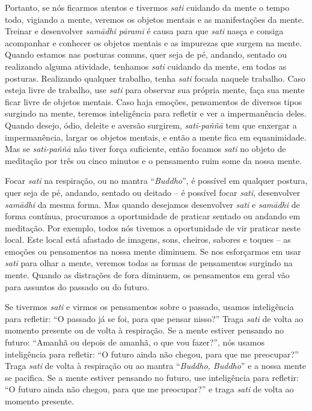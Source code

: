 Portanto, se nós ficarmos atentos e tivermos \textit{sati }cuidando
da mente o tempo todo, vigiando a mente, veremos os objetos mentais e
as manifestações da mente. Treinar e desenvolver \textit{samādhi
pāramī }é causa para que \textit{sati }nasça e consiga acompanhar
e conhecer os objetos mentais e as impurezas que surgem na mente.
Quando estamos nas posturas comuns, quer seja de pé, andando, sentado
ou realizando alguma atividade, tenhamos \textit{sati }cuidando da
mente, em todas as posturas. Realizando qualquer trabalho, tenha
\textit{sati }focada naquele trabalho. Caso esteja livre de trabalho,
use \textit{sati }para observar sua própria mente, faça sua mente ficar
livre de objetos mentais. Caso haja emoções, pensamentos de diversos
tipos surgindo na mente, teremos inteligência para refletir e ver a
impermanência deles. Quando desejo, ódio, deleite e aversão surgirem,
\textit{sati-paññā }tem que enxergar a impermanência, largar os
objetos mentais, e então a mente fica em equanimidade. Mas se
\textit{sati-paññā }não tiver força suficiente, então focamos
\textit{sati }no objeto de meditação por três ou cinco minutos e o
pensamento ruim some da nossa mente.

Focar \textit{sati }na respiração, ou no mantra “\textit{Buddho}”, é
possível em qualquer postura, quer seja de pé, andando, sentado ou
deitado – é possível focar \textit{sati}, desenvolver
\textit{samādhi} da mesma forma. Mas quando desejamos desenvolver
\textit{sati} e \textit{samādhi} de forma contínua, procuramos a
oportunidade de praticar sentado ou andando em meditação. Por exemplo,
todos nós tivemos a oportunidade de vir praticar neste local. Este
local está afastado de imagens, sons, cheiros, sabores e toques – as
emoções ou pensamentos na nossa mente diminuem. Se nos esforçarmos em
usar \textit{sati }para olhar a mente, veremos todas as formas de
pensamentos surgindo na mente. Quando as distrações de fora diminuem,
os pensamentos em geral vão para assuntos do passado ou do futuro.

Se tivermos \textit{sati }e virmos os pensamentos sobre o passado,
usamos inteligência para refletir: “O passado já se foi, para que
pensar nisso?” Traga \textit{sati }de volta ao momento presente ou de
volta à respiração. Se a mente estiver pensando no futuro: “Amanhã ou
depois de amanhã, o que vou fazer?”, nós usamos inteligência para
refletir: “O futuro ainda não chegou, para que me preocupar?” Traga
\textit{sati }de volta à respiração ou ao mantra “\textit{Buddho,
Buddho}” e a nossa mente se pacifica. Se a mente estiver pensando no
futuro, use inteligência para refletir: “O futuro ainda não chegou,
para que me preocupar?” e traga \textit{sati }de volta ao momento
presente.

